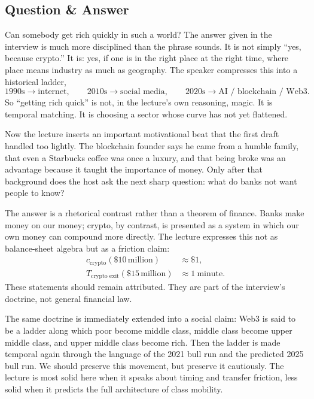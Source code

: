 \subsection{Question \& Answer}

Can somebody get rich quickly in such a world? The answer given in the interview is much more disciplined than the phrase sounds. It is not simply ``yes, because crypto.'' It is: yes, if one is in the right place at the right time, where place means industry as much as geography. The speaker compresses this into a historical ladder,
\begin{equation}
1990\text{s} \to \text{internet},
\qquad
2010\text{s} \to \text{social media},
\qquad
2020\text{s} \to \text{AI / blockchain / Web3}.
\end{equation}
So ``getting rich quick'' is not, in the lecture's own reasoning, magic. It is temporal matching. It is choosing a sector whose curve has not yet flattened.

Now the lecture inserts an important motivational beat that the first draft handled too lightly. The blockchain founder says he came from a humble family, that even a Starbucks coffee was once a luxury, and that being broke was an advantage because it taught the importance of money. Only after that background does the host ask the next sharp question: what do banks not want people to know?

The answer is a rhetorical contrast rather than a theorem of finance. Banks make money on our money; crypto, by contrast, is presented as a system in which our own money can compound more directly. The lecture expresses this not as balance-sheet algebra but as a friction claim:
\begin{align}
c_{\text{crypto}}(\$10\,\text{million}) &\approx \$1, \\
T_{\text{crypto exit}}(\$15\,\text{million}) &\approx 1\ \text{minute}.
\end{align}
These statements should remain attributed. They are part of the interview's doctrine, not general financial law.

The same doctrine is immediately extended into a social claim: Web3 is said to be a ladder along which poor become middle class, middle class become upper middle class, and upper middle class become rich. Then the ladder is made temporal again through the language of the 2021 bull run and the predicted 2025 bull run. We should preserve this movement, but preserve it cautiously. The lecture is most solid here when it speaks about timing and transfer friction, less solid when it predicts the full architecture of class mobility.


